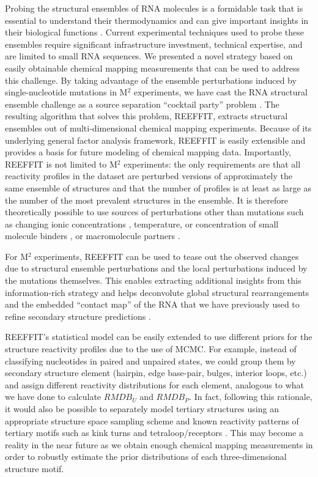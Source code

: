 \documentclass[12pt]{article}
\begin{document}
Probing the structural ensembles of RNA molecules is a formidable task that is essential to understand their thermodynamics and can give important insights in their biological functions \cite{Bothe2011}. 
Current experimental techniques used to probe these ensembles require significant infrastructure investment, technical expertise, and are limited to small RNA sequences. 
We presented a novel strategy based on easily obtainable chemical mapping measurements that can be used to address this challenge. 
By taking advantage of the ensemble perturbations induced by single-nucleotide mutations in M$^2$ experiments, we have cast the RNA structural ensemble challenge as a source separation ``cocktail party'' problem \cite{Cardoso1998}. 
The resulting algorithm that solves this problem, REEFFIT, extracts structural ensembles out of multi-dimensional chemical mapping experiments. 
Because of its underlying general factor analysis framework, REEFFIT is easily extensible and provides a basis for future modeling of chemical mapping data. 
Importantly, REEFFIT is not limited to M$^2$ experiments: the only requirements are that all reactivity profiles in the dataset are perturbed versions of approximately the same ensemble of structures and that the number of profiles is at least as large as the number of the most prevalent structures in the ensemble. 
It is therefore theoretically possible to use sources of perturbations other than mutations such as changing ionic concentrations  \cite{Das2010}, temperature, or concentration of small molecule binders \cite{Kladwang2011f}, or macromolecule partners \cite{Kladwang2010}.

For M$^2$ experiments, REEFFIT can be used to tease out the observed changes due to structural ensemble perturbations and the local perturbations induced by the mutations themselves. 
This enables extracting additional insights from this information-rich strategy and helps deconvolute global structural rearrangements and the embedded “contact map” of the RNA that we have previously used to refine secondary structure predictions \cite{Kladwang2011f}.

REEFFIT's statistical model can be easily extended to use different priors for the structure reactivity profiles due to the use of MCMC. 
For example, instead of classifying nucleotides in paired and unpaired states, we could group them by secondary structure element (hairpin, edge base-pair, bulges, interior loops, etc.) and assign different reactivity distributions for each element, analogous to what we have done to calculate $RMDB_U$ and $RMDB_P$. 
In fact, following this rationale, it would also be possible to separately model tertiary structures using an appropriate structure space sampling scheme and known reactivity patterns of tertiary motifs such as kink turns and tetraloop/receptors \cite{Frellsen2009,Das2007,Das2010,Jonikas2009}. 
This may become a reality in the near future as we obtain enough chemical mapping measurements in order to robustly estimate the prior distributions of each three-dimensional structure motif.
\end{document}
